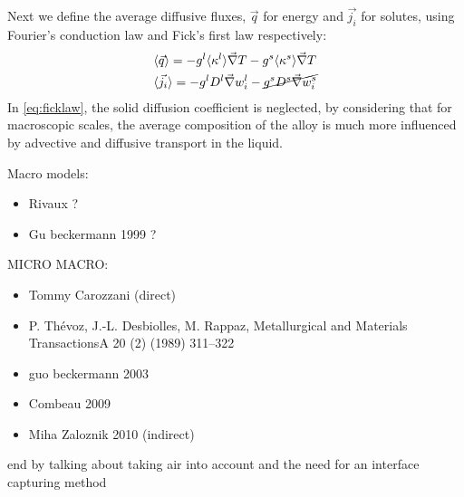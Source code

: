 Next we define the average diffusive fluxes, $\vec{q}$ for energy and $\vec{j_i}$ for solutes, using Fourier's conduction law and Fick's first law respectively:
\begin{align}
\label{eq:fourierlaw}
& \langle \vec{q} \rangle = - {g^l} \langle \kappa^l \rangle \vec{\nabla} T -  {g^s} \langle \kappa^s \rangle \vec{\nabla} T 	\\
\label{eq:ficklaw}
& \langle \vec{j_i} \rangle = - {g^l} D^l \vec{\nabla} w_i^l - \cancel{{g^s} D^s \vec{\nabla} w_i^s}
\end{align}
In \cref{eq:ficklaw}, the solid diffusion coefficient is neglected, 
by considering that for macroscopic scales, the average composition of the alloy is much more influenced by advective 
and diffusive transport in the liquid.

Macro models:
\begin{itemize}
\item Rivaux ?
\item Gu beckermann 1999 ?
\end{itemize}
MICRO MACRO: 
\begin{itemize}
\item Tommy Carozzani (direct)
\item P. Thévoz, J.-L. Desbiolles, M. Rappaz, Metallurgical and Materials TransactionsA 20 (2) (1989) 311–322
\item guo  beckermann 2003
\item Combeau 2009
\item Miha Zaloznik 2010 (indirect)
\end{itemize}
end by talking about taking air into account and the need for an interface capturing method
